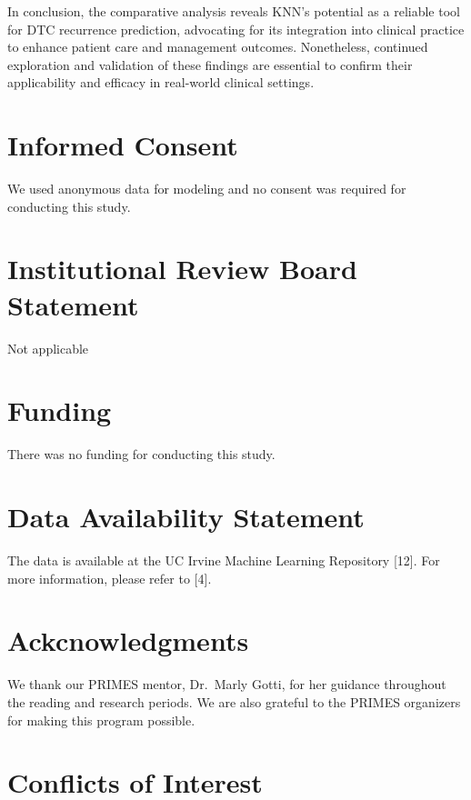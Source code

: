 \documentclass[
  letterpaper,
  DIV=11,
  numbers=noendperiod]{scrartcl}
\begin{document}
In conclusion, the comparative analysis reveals KNN's potential as a
reliable tool for DTC recurrence prediction, advocating for its
integration into clinical practice to enhance patient care and
management outcomes. Nonetheless, continued exploration and validation
of these findings are essential to confirm their applicability and
efficacy in real-world clinical settings.

\section{Informed Consent}\label{informed-consent}

We used anonymous data for modeling and no consent was required for
conducting this study.

\section{Institutional Review Board
Statement}\label{institutional-review-board-statement}

Not applicable

\section{Funding}\label{funding}

There was no funding for conducting this study.

\section{Data Availability Statement}\label{data-availability-statement}

The data is available at the UC Irvine Machine Learning Repository
{[}12{]}. For more information, please refer to {[}4{]}.

\section{Ackcnowledgments}\label{ackcnowledgments}

We thank our PRIMES mentor, Dr.~Marly Gotti, for her guidance throughout
the reading and research periods. We are also grateful to the PRIMES
organizers for making this program possible.

\section{Conflicts of Interest}\label{conflicts-of-interest}
\end{document}
